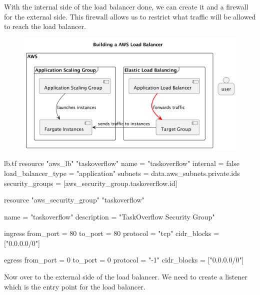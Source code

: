 \documentclass{csse4400}
\begin{document}
With the internal side of the load balancer done, we can create it and a firewall for the external side.
This firewall allows us to restrict what traffic will be allowed to reach the load balancer.

\begin{figure}[H]
  \begin{center}
    \includegraphics[scale=0.2]{diagrams/lb3fargate}
  \end{center}
\end{figure}

\begin{code}[language=terraform,numbers=none,keepspaces=true]{lb.tf}
resource "aws_lb" "taskoverflow" {
  name               = "taskoverflow"
  internal           = false
  load_balancer_type = "application"
  subnets            = data.aws_subnets.private.ids
  security_groups    = [aws_security_group.taskoverflow.id]
}

resource "aws_security_group" "taskoverflow" {
  name        = "taskoverflow"
  description = "TaskOverflow Security Group"

  ingress {
    from_port     = 80
    to_port       = 80
    protocol      = "tcp"
    cidr_blocks   = ["0.0.0.0/0"]
  }

  egress {
    from_port     = 0
    to_port       = 0
    protocol      = "-1"
    cidr_blocks   = ["0.0.0.0/0"]
  }
}
\end{code}

Now over to the external side of the load balancer.
We need to create a listener which is the entry point for the load balancer.
\end{document}
